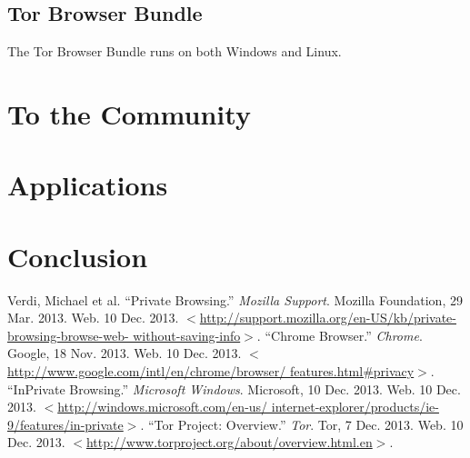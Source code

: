 \documentclass[pdftex,letterpaper,titlepage,11pt]{article}
\begin{document}
    \subsection{Tor Browser Bundle}
    The Tor Browser Bundle runs on both Windows and Linux. 

  \section{To the Community}

  \section{Applications}

  \section{Conclusion}

  \begin{thebibliography}{9}
      Verdi, Michael et al. ``Private Browsing.'' \emph{Mozilla Support}. 
      Mozilla Foundation, 29 Mar. 2013. Web. 10 Dec. 2013. 
      $<$\url{http://support.mozilla.org/en-US/kb/private-browsing-browse-web-
      without-saving-info}$>$.
      ``Chrome Browser.'' \emph{Chrome}. Google, 18 Nov. 2013. Web. 10 Dec. 
      2013. $<$\url{http://www.google.com/intl/en/chrome/browser/
      features.html#privacy}$>$.
      ``InPrivate Browsing.'' \emph{Microsoft Windows}. Microsoft, 10 Dec. 
      2013. Web. 10 Dec. 2013. $<$\url{http://windows.microsoft.com/en-us/
      internet-explorer/products/ie-9/features/in-private}$>$.
      ``Tor Project: Overview.'' \emph{Tor}. Tor, 7 Dec. 2013. Web. 10 Dec. 
      2013. $<$\url{http://www.torproject.org/about/overview.html.en}$>$. 

  \end{thebibliography}
\end{document}

